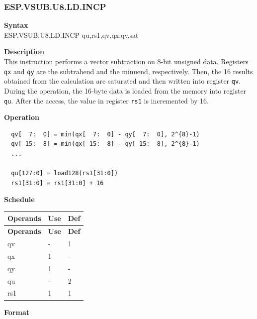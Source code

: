 \newpage
\subsubsection{ESP.VSUB.U8.LD.INCP}\label{instruction:ESPVSUBU8LDINCP}
\textbf{Syntax}\\
ESP.VSUB.U8.LD.INCP qu,rs1,qv,qx,qy,sat

\textbf{Description}\\
This instruction performs a vector subtraction on 8-bit unsigned data. Registers \lstinline{qx} and \lstinline{qy} are the subtrahend and the minuend, respectively. Then, the 16 results obtained from the calculation are saturated and then written into register \lstinline{qv}. \\ During the operation, the 16-byte data is loaded from the memory into register \lstinline{qu}. After the access, the value in register \lstinline{rs1} is incremented by 16.

\textbf{Operation}\\
\begin{lstlisting}
  qv[  7:  0] = min(qx[  7:  0] - qy[  7:  0], 2^{8}-1)
  qv[ 15:  8] = min(qx[ 15:  8] - qy[ 15:  8], 2^{8}-1)
  ...

  qu[127:0] = load128(rs1[31:0])
  rs1[31:0] = rs1[31:0] + 16
\end{lstlisting}

\textbf{Schedule}\\
\begin{longtable}[c]{|l|l|l|}
    \hline
    \rowcolor{lightgray}
    \textbf{Operands} & \textbf{Use} & \textbf{Def} \\\hline
    \endfirsthead
    \hline
    \rowcolor{lightgray}
     \textbf{Operands} & \textbf{Use} & \textbf{Def} \\\hline
    \endhead
    \hline
    \endfoot

  qv & - & 1 \\\hline
    qx & 1 & - \\\hline
    qy & 1 & - \\\hline
    qu & - & 2 \\\hline
    rs1 & 1 & 1

\end{longtable}

\textbf{Format}\\

